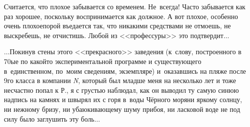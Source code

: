 Считается, что плохое забывается со временем. Не~всегда! Часто забывается как раз хорошее, поскольку воспринимается как должное. А вот плохое, особенно очень плохое\mdash порой въедается так, что никакими средствами не отмоешь, не выскребешь, не отчистишь. Любой из <<профессуры>> это подтвердит$\ldots$

$\ldots$Покинув стены этого <<прекрасного>> заведения (к~слову, построенного в 70\sdash ые по какой\sdash то экспериментальной программе и существующего в~единственном, по~моим сведениям, экземпляре) и~оказавшись на пляже после 9\sdash го класса в компании \textit{N}, который был младше меня на несколько лет и тоже несчастно попал к Р., я с грустью наблюдал, как он выводил ту самую синюю надпись на камнях и швырял их с горя в~воды Чёрного моря\mdash ни яркому солнцу, ни нежному бризу, ни убаюкивающему шуму прибоя, ни ласковой воде не под силу было заглушить эту боль$\ldots$

\begin{center}
\end{center}